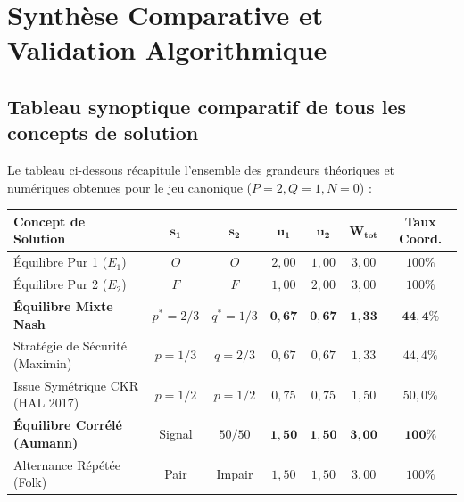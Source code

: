 \documentclass[11pt,a4paper]{article}
\begin{document}
\newpage

\section{Synthèse Comparative et Validation Algorithmique}\label{sec:bilan}

\subsection{Tableau synoptique comparatif de tous les concepts de solution}
Le tableau ci-dessous récapitule l'ensemble des grandeurs théoriques et numériques obtenues pour le jeu canonique ($P = 2, Q = 1, N = 0$) :

\begin{center}
\renewcommand{\arraystretch}{1.3}
\begin{tabular}{lcccccc}
\toprule
\textbf{Concept de Solution} & $\mathbf{s_1}$ & $\mathbf{s_2}$ & $\mathbf{u_1}$ & $\mathbf{u_2}$ & $\mathbf{W_{tot}}$ & \textbf{Taux Coord.} \\
\midrule
Équilibre Pur 1 ($E_1$) & $O$ & $O$ & $2{,}00$ & $1{,}00$ & $3{,}00$ & $100\%$ \\
Équilibre Pur 2 ($E_2$) & $F$ & $F$ & $1{,}00$ & $2{,}00$ & $3{,}00$ & $100\%$ \\
\textbf{Équilibre Mixte Nash} & $p^*=2/3$ & $q^*=1/3$ & $\mathbf{0{,}67}$ & $\mathbf{0{,}67}$ & $\mathbf{1{,}33}$ & $\mathbf{44{,}4\%}$ \\
Stratégie de Sécurité (Maximin) & $p=1/3$ & $q=2/3$ & $0{,}67$ & $0{,}67$ & $1{,}33$ & $44{,}4\%$ \\
Issue Symétrique CKR (HAL 2017) & $p=1/2$ & $p=1/2$ & $0{,}75$ & $0{,}75$ & $1{,}50$ & $50{,}0\%$ \\
\textbf{Équilibre Corrélé (Aumann)} & Signal & $50/50$ & $\mathbf{1{,}50}$ & $\mathbf{1{,}50}$ & $\mathbf{3{,}00}$ & $\mathbf{100\%}$ \\
Alternance Répétée (Folk) & Pair & Impair & $1{,}50$ & $1{,}50$ & $3{,}00$ & $100\%$ \\
\bottomrule
\end{tabular}
\end{center}
\end{document}
